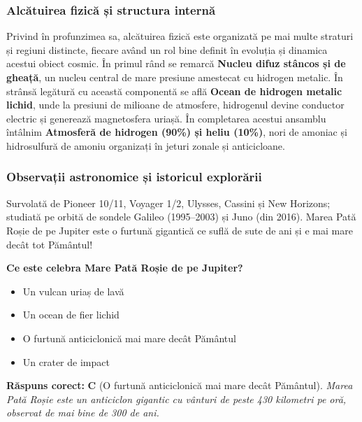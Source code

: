 \subsubsection*{Alcătuirea fizică și structura internă}
Privind în profunzimea sa, alcătuirea fizică este organizată pe mai multe straturi și regiuni distincte, fiecare având un rol bine definit în evoluția și dinamica acestui obiect cosmic. În primul rând se remarcă \textbf{Nucleu difuz stâncos și de gheață}, un nucleu central de mare presiune amestecat cu hidrogen metalic. În strânsă legătură cu această componentă se află \textbf{Ocean de hidrogen metalic lichid}, unde la presiuni de milioane de atmosfere, hidrogenul devine conductor electric și generează magnetosfera uriașă. În completarea acestui ansamblu întâlnim \textbf{Atmosferă de hidrogen (90\%) și heliu (10\%)}, nori de amoniac și hidrosulfură de amoniu organizați în jeturi zonale și anticicloane.

\subsubsection*{Observații astronomice și istoricul explorării}
Survolată de Pioneer 10/11, Voyager 1/2, Ulysses, Cassini și New Horizons; studiată pe orbită de sondele Galileo (1995--2003) și Juno (din 2016). Marea Pată Roșie de pe Jupiter este o furtună gigantică ce suflă de sute de ani și e mai mare decât tot Pământul!

\vspace{6pt}
\begin{tcolorbox}[orbitarquiz, title={\textbf{Întrebare de verificare \#9: Jupiter}}]
\textbf{Ce este celebra \guillemotleft{}Mare Pată Roșie\guillemotright{} de pe Jupiter?}
\begin{itemize}[leftmargin=2.2em, itemsep=2pt, topsep=4pt]
  \item[$\square$ \textbf{A.}] Un vulcan uriaș de lavă
  \item[$\square$ \textbf{B.}] Un ocean de fier lichid
  \item[$\square$ \textbf{C.}] O furtună anticiclonică mai mare decât Pământul
  \item[$\square$ \textbf{D.}] Un crater de impact
\end{itemize}
\vspace{2pt}
{\footnotesize\color{orbitarMuted}\textbf{Răspuns corect:} \textbf{C} (O furtună anticiclonică mai mare decât Pământul). \emph{Marea Pată Roșie este un anticiclon gigantic cu vânturi de peste 430 kilometri pe oră, observat de mai bine de 300 de ani.}}
\end{tcolorbox}
\clearpage


